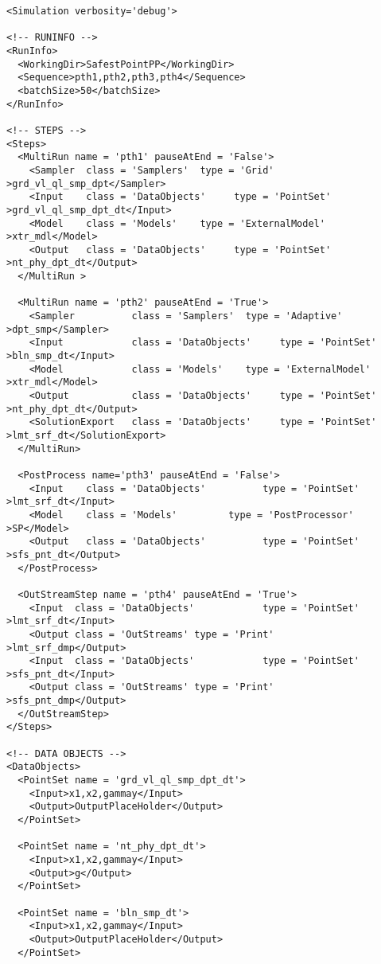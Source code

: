 \begin{lstlisting}[style=XML,morekeywords={debug,re,seeding,class,subType,limit}]
<Simulation verbosity='debug'>

<!-- RUNINFO -->
<RunInfo>
  <WorkingDir>SafestPointPP</WorkingDir>
  <Sequence>pth1,pth2,pth3,pth4</Sequence>
  <batchSize>50</batchSize>
</RunInfo>

<!-- STEPS -->
<Steps>
  <MultiRun name = 'pth1' pauseAtEnd = 'False'>
    <Sampler  class = 'Samplers'  type = 'Grid'           >grd_vl_ql_smp_dpt</Sampler>
    <Input    class = 'DataObjects'     type = 'PointSet'   >grd_vl_ql_smp_dpt_dt</Input>
    <Model    class = 'Models'    type = 'ExternalModel'  >xtr_mdl</Model>
    <Output   class = 'DataObjects'     type = 'PointSet'   >nt_phy_dpt_dt</Output>
  </MultiRun >

  <MultiRun name = 'pth2' pauseAtEnd = 'True'>
    <Sampler          class = 'Samplers'  type = 'Adaptive'      >dpt_smp</Sampler>
    <Input            class = 'DataObjects'     type = 'PointSet'  >bln_smp_dt</Input>
    <Model            class = 'Models'    type = 'ExternalModel' >xtr_mdl</Model>
    <Output           class = 'DataObjects'     type = 'PointSet'  >nt_phy_dpt_dt</Output>
    <SolutionExport   class = 'DataObjects'     type = 'PointSet'  >lmt_srf_dt</SolutionExport>
  </MultiRun>

  <PostProcess name='pth3' pauseAtEnd = 'False'>
    <Input    class = 'DataObjects'          type = 'PointSet'       >lmt_srf_dt</Input>
    <Model    class = 'Models'         type = 'PostProcessor'  >SP</Model>
    <Output   class = 'DataObjects'          type = 'PointSet'     >sfs_pnt_dt</Output>
  </PostProcess>

  <OutStreamStep name = 'pth4' pauseAtEnd = 'True'>
  	<Input  class = 'DataObjects'            type = 'PointSet'  >lmt_srf_dt</Input>
  	<Output class = 'OutStreams' type = 'Print'         >lmt_srf_dmp</Output>
    <Input  class = 'DataObjects'            type = 'PointSet'  >sfs_pnt_dt</Input>
  	<Output class = 'OutStreams' type = 'Print'         >sfs_pnt_dmp</Output>
  </OutStreamStep>
</Steps>

<!-- DATA OBJECTS -->
<DataObjects>
  <PointSet name = 'grd_vl_ql_smp_dpt_dt'>
    <Input>x1,x2,gammay</Input>
    <Output>OutputPlaceHolder</Output>
  </PointSet>

  <PointSet name = 'nt_phy_dpt_dt'>
    <Input>x1,x2,gammay</Input>
    <Output>g</Output>
  </PointSet>

  <PointSet name = 'bln_smp_dt'>
    <Input>x1,x2,gammay</Input>
    <Output>OutputPlaceHolder</Output>
  </PointSet>


\end{lstlisting}
